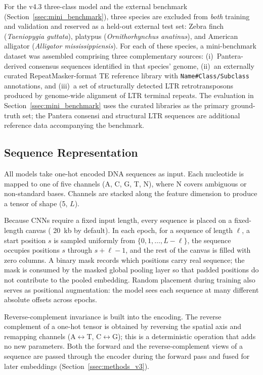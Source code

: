 \documentclass[12pt]{article}
\begin{document}
For the v4.3 three-class model and the external benchmark (Section~\ref{ssec:mini_benchmark}), three species are excluded from \emph{both} training and validation and reserved as a held-out external test set: Zebra finch (\textit{Taeniopygia guttata}), platypus (\textit{Ornithorhynchus anatinus}), and American alligator (\textit{Alligator mississippiensis}). For each of these species, a mini-benchmark dataset was assembled comprising three complementary sources: (i)~Pantera-derived consensus sequences identified in that species' genome, (ii)~an externally curated RepeatMasker-format TE reference library with \texttt{Name\#Class/Subclass} annotations, and (iii)~a set of structurally detected LTR retrotransposons produced by genome-wide alignment of LTR terminal repeats. The evaluation in Section~\ref{ssec:mini_benchmark} uses the curated libraries as the primary ground-truth set; the Pantera consensi and structural LTR sequences are additional reference data accompanying the benchmark.

\subsection{Sequence Representation}\label{ssec:repr}

All models take one-hot encoded DNA sequences as input. Each nucleotide is mapped to one of five channels (A, C, G, T, N), where N covers ambiguous or non-standard bases. Channels are stacked along the feature dimension to produce a tensor of shape (5, $L$). 

Because CNNs require a fixed input length, every sequence is placed on a fixed-length canvas ( 20~kb by default). In each epoch, for a sequence of length $\ell$, a start position $s$ is sampled uniformly from $\{0, 1, \dots, L-\ell\}$, the sequence occupies positions $s$ through $s+\ell-1$, and the rest of the canvas is filled with zero columns. A binary mask records which positions carry real sequence; the mask is consumed by the masked global pooling layer so that padded positions do not contribute to the pooled embedding. Random placement during training also serves as positional augmentation: the model sees each sequence at many different absolute offsets across epochs.

Reverse-complement invariance is built into the encoding. The reverse complement of a one-hot tensor is obtained by reversing the spatial axis and remapping channels (A$\leftrightarrow$T, C$\leftrightarrow$G); this is a deterministic operation that adds no new parameters. Both the forward and the reverse-complement views of a sequence are passed through the encoder during the forward pass and fused for later embeddings (Section~\ref{ssec:methods_v3}).
\end{document}
